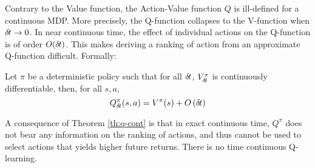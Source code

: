 Contrary to the Value function, the Action-Value function $Q$ is ill-defined
for a continuous MDP. More precisely, the Q-function  collapses to the
V-function when ${\delta\hspace{-.1em}t} \rightarrow 0$. In near continuous time, the effect of
individual actions on the Q-function is of order $O({\delta\hspace{-.1em}t})$. This makes
deriving a ranking of action from an approximate Q-function difficult.
Formally:
\begin{theorem}
	Let $\pi$ be a deterministic policy such that for all ${\delta\hspace{-.1em}t}$, $V^\pi_{\delta\hspace{-.1em}t}$ is continuously
	differentiable, then, for all $s, a$,
	\begin{equation}
		\label{eq:q-discr}
		Q^\pi_{\delta\hspace{-.1em}t}(s, a) = V^\pi(s) + O\left({\delta\hspace{-.1em}t}\right)
	\end{equation}

  \label{th:q-cont}
\end{theorem}

A consequence of Theorem \ref{th:q-cont} is that in exact continuous time,
$Q^\pi$ does not bear any information on the ranking of actions, and
thus cannot be used to select actions that yields higher future returns. There is no time continuous Q-learning.

